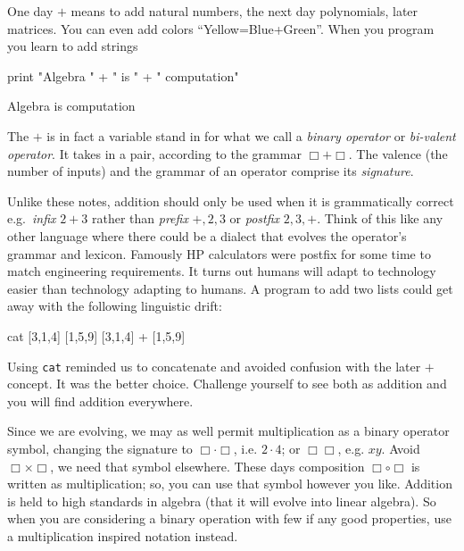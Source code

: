 

One day  $+$ means to add natural numbers, the next day 
polynomials, later matrices.  
You can even add colors ``Yellow=Blue+Green''. When you program 
you learn to add strings
\begin{center}
\begin{notebookin}
print "Algebra " + " is " + " computation"
\end{notebookin}
\begin{notebookout}
Algebra is computation
\end{notebookout}
\end{center}
The $+$ is in fact a variable stand in for what we call a \emph{binary operator}
or \emph{bi-valent operator}.  It takes in a pair, 
according to the grammar $\Box+\Box$.  The valence (the number of inputs) and the grammar 
of an operator comprise its  \emph{signature}.  

Unlike these notes, addition should only be used when it is grammatically 
correct e.g.\ \emph{infix} $2+3$ rather than \emph{prefix} $+,2,3$ or
\emph{postfix} $2,3,+$.  Think of this like any other language 
where there could be a dialect that evolves the operator's grammar and lexicon.
Famously HP calculators were postfix for some time to match engineering requirements.
It turns out humans will adapt to technology easier than technology adapting to humans.
A program to add two lists could get away with the following linguistic drift:
\begin{center}
\begin{notebookin}
cat [3,1,4] [1,5,9]
[3,1,4] + [1,5,9]
\end{notebookin}
\begin{notebookout}[2]
[3,1,4,1,5,9]
[4,6,13]
\end{notebookout}
\end{center}
Using \texttt{cat} reminded us to concatenate and avoided confusion with the later $+$ 
concept.  It was the better choice.
Challenge yourself to see both as addition and you will 
find addition everywhere. 

Since we are evolving, we may as well permit multiplication as a binary operator
symbol, changing the signature to $\Box \cdot \Box$, i.e. $2\cdot 4$; or
$\Box\Box$, e.g. $xy$.   Avoid $\Box\times \Box$, we need that symbol elsewhere.
These days composition $\Box\circ\Box$ is written as multiplication; so, you can
use that symbol however you like.  Addition is held to high standards in algebra
(that it will evolve into linear algebra).  So when you are considering a binary
operation with few if any good properties, use a multiplication inspired
notation instead.   






